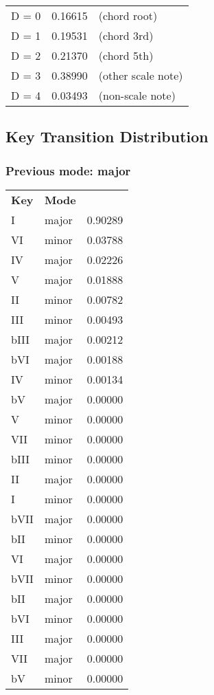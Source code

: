 \begin{tabular}{l l l}
D = 0 & 0.16615 & (chord root)\\
D = 1 & 0.19531 & (chord 3rd)\\
D = 2 & 0.21370 & (chord 5th)\\
D = 3 & 0.38990 & (other scale note)\\
D = 4 & 0.03493 & (non-scale note)\\
\end{tabular}


\subsection{Key Transition Distribution}

\subsubsection*{Previous mode: major}

\begin{tabular}{l l l}
\textbf{Key} & \textbf{Mode} \\
I & major & 0.90289 \\
VI & minor & 0.03788 \\
IV & major & 0.02226 \\
V & major & 0.01888 \\
II & minor & 0.00782 \\
III & minor & 0.00493 \\
bIII & major & 0.00212 \\
bVI & major & 0.00188 \\
IV & minor & 0.00134 \\
bV & major & 0.00000 \\
V & minor & 0.00000 \\
VII & minor & 0.00000 \\
bIII & minor & 0.00000 \\
II & major & 0.00000 \\
I & minor & 0.00000 \\
bVII & major & 0.00000 \\
bII & minor & 0.00000 \\
VI & major & 0.00000 \\
bVII & minor & 0.00000 \\
bII & major & 0.00000 \\
bVI & minor & 0.00000 \\
III & major & 0.00000 \\
VII & major & 0.00000 \\
bV & minor & 0.00000 \\
\end{tabular}

